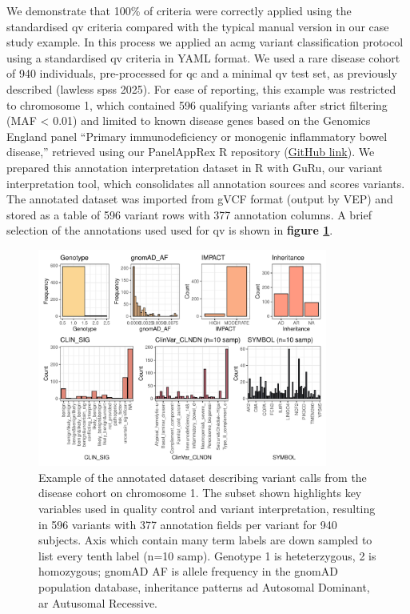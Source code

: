 We demonstrate that 100\% of criteria were correctly applied using the standardised \ac{qv} criteria compared with the typical manual version in our case study example.
In this process we applied an \ac{acmg} variant classification
protocol \cite{richards2015standards} using a standardised \ac{qv} criteria in YAML format.
We used a rare disease cohort of 940 individuals, pre-processed for 
\ac{qc} and a minimal \ac{qv} test set, as previously described (lawless spss 2025). 
For ease of reporting, this example was restricted to chromosome 1, which contained 596 qualifying variants after strict filtering (MAF < 0.01) and limited to known disease genes based on the Genomics England panel ``Primary immunodeficiency or monogenic inflammatory bowel disease,'' retrieved using our PanelAppRex R repository (\href{https://github.com/DylanLawless/PanelAppRex}{GitHub link}). 
We prepared this annotation interpretation dataset in R with GuRu, our variant interpretation tool, which consolidates all annotation sources and scores variants. The annotated dataset was imported from gVCF format (output by VEP) and stored as a table of 596 variant rows with 377 annotation columns. A brief selection of the annotations used used for \ac{qv} is shown in \textbf{figure \ref{fig:guru_case_study_setup}}.

\begin{figure}[!h]
    \centering
   \includegraphics[width=0.85\textwidth]{./images/Guru_singlecase_distribution_variables.pdf}
       \caption{Example of the annotated dataset describing variant calls from the disease cohort on chromosome 1. The subset shown highlights key variables used in quality control and variant interpretation, resulting in 596 variants with 377 annotation fields per variant for 940 subjects. Axis which contain many term labels are down sampled to list every tenth  label (n=10 samp). Genotype 1 is heteterzygous, 2 is homozygous; gnomAD AF is allele frequency in the gnomAD population database, inheritance patterns \ac{ad} Autosomal Dominant, \ac{ar} Autusomal Recessive.}
    \label{fig:guru_case_study_setup}
\end{figure}

